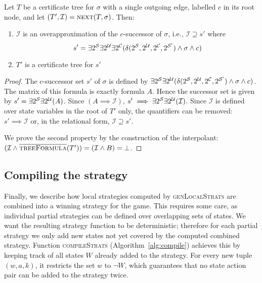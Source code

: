 \begin{proposition}\label{prop:next}
    Let $T$ be a certificate tree for $\sigma$ with a single outgoing edge, labelled $c$ in its root node, and let $(T',\mathcal{I})
    = \textsc{next}(T,\sigma)$.
    Then:
    \begin{enumerate}
        \item $\mathcal{I}$ is an overapproximation of the $c$-successor of $\sigma$, i.e., $\mathcal{I} \supseteq s'$ where $$s' = \exists 2^{\mathcal{S}} \exists 2^{\mathcal{U}} \exists 2^{\mathcal{C}} (\delta(2^{\mathcal{S}}, 2^{\mathcal{U}}, 2^{\mathcal{C}}, 2^{\mathcal{S}'}) \land \sigma \land c)$$
        \item $T'$ is a certificate tree for $s'$
    \end{enumerate}
\end{proposition}
\begin{proof}
    The $c$-successor set $s'$ of $\sigma$ is defined by $\exists 2^{\mathcal{S}} \exists 2^{\mathcal{U}} (\delta(2^{\mathcal{S}}, 2^{\mathcal{U}}, 2^{\mathcal{C}}, 2^{\mathcal{S}'}) \land \sigma \land c)$. The matrix of this formula is exactly formula $A$.  Hence the successor set is given by $s' = \exists 2^{\mathcal{S}} \exists 2^{\mathcal{U}} (A)$.  Since $(A \implies \mathcal{I})$, $s' \implies \exists 2^{\mathcal{S}} \exists 2^{\mathcal{U}} (\mathcal{I})$.  Since $\mathcal{I}$ is defined over state variables in the root of $T'$ only, the quantifiers can be removed: $s' \implies \mathcal{I}$ or, in the relational form, $\mathcal{I} \supseteq s'$.
    
    We prove the second property by the construction of the interpolant: $(\mathcal{I} \land \textsc{$\overline{\mbox{treeFormula}}$}(T')) = (\mathcal{I} \land B) = \bot$.
\end{proof}

\subsection{Compiling the strategy}

Finally, we describe how local strategies computed by \textsc{genLocalStrats} are combined into a winning strategy for the game.  This requires some care, as individual partial strategies can be defined over overlapping sets of states.  We want the resulting strategy function to be deterministic; therefore for each partial strategy we only add new states not yet covered by the computed combined strategy.  Function \textsc{compileStrats} (Algorithm~\ref{alg:compile}) achieves this by keeping track of all states $W$ already added to the strategy.  For every new tuple $(w, a, k)$, it restricts the set $w$ to $\neg W$, which guarantees that no state action pair can be added to the strategy twice.  

